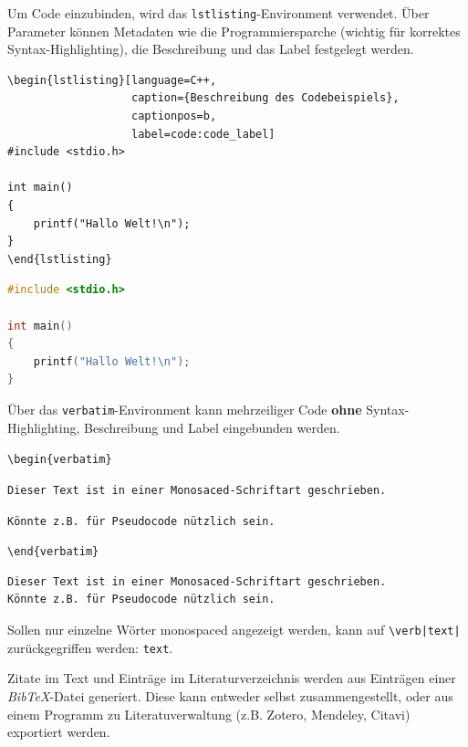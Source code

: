 
Um Code einzubinden, wird das \verb|lstlisting|-Environment verwendet.
Über Parameter können Metadaten wie die Programmiersparche (wichtig für korrektes Syntax-Highlighting), die Beschreibung und das Label festgelegt werden.

\begin{verbatim}
\begin{lstlisting}[language=C++,
                   caption={Beschreibung des Codebeispiels},
                   captionpos=b,
                   label=code:code_label]
#include <stdio.h>

int main()
{
    printf("Hallo Welt!\n");
}
\end{lstlisting}
\end{verbatim}

\begin{lstlisting}[language=C++,
                   caption={Beschreibung des Codebeispiels},
                   captionpos=b,
                   label=code:code_label]
#include <stdio.h>

int main()
{
    printf("Hallo Welt!\n");
}
\end{lstlisting}

Über das \verb|verbatim|-Environment kann mehrzeiliger Code \textbf{ohne} Syntax-Highlighting, Beschreibung und Label eingebunden werden.

\verb|\begin{verbatim}|

\verb|Dieser Text ist in einer Monosaced-Schriftart geschrieben.|

\verb|Könnte z.B. für Pseudocode nützlich sein.|

\verb|\end{verbatim}|

\begin{verbatim}
Dieser Text ist in einer Monosaced-Schriftart geschrieben.
Könnte z.B. für Pseudocode nützlich sein.
\end{verbatim}

Sollen nur einzelne Wörter monospaced angezeigt werden, kann auf \verb!\verb|text|! zurückgegriffen werden: \verb|text|.



Zitate im Text und Einträge im Literaturverzeichnis werden aus Einträgen einer \emph{BibTeX}-Datei generiert.
Diese kann entweder selbst zusammengestellt, oder aus einem Programm zu Literatuverwaltung (z.B. Zotero, Mendeley, Citavi) exportiert werden.

